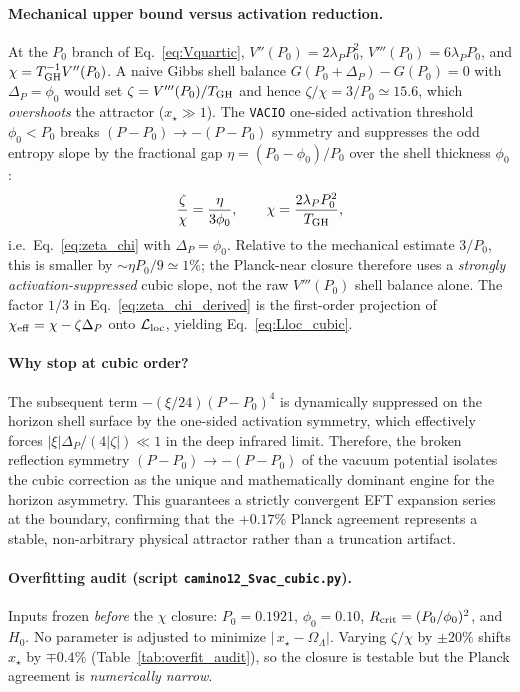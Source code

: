 \documentclass[prd,
               reprint,
               aps,
               preprintnumbers,
               nofootinbib,
               longbibliography,
               floatfix]{revtex4-2}
\begin{document}
\paragraph{Mechanical upper bound versus activation reduction.}
At the $P_0$ branch of Eq.~\eqref{eq:Vquartic},
$V''(P_0)=2\lambda_P P_0^2$, $V'''(P_0)=6\lambda_P P_0$, and
$\chi=T_{\rm GH}^{-1}V''(P_0)$.
A naive Gibbs shell balance
$G(P_0+\Delta_P)-G(P_0)=0$ with $\Delta_P=\phi_0$ would set
$\zeta=V'''(P_0)/T_{\rm GH}$ and hence $\zeta/\chi=3/P_0\simeq 15.6$,
which \emph{overshoots} the attractor ($x_\star\gg 1$).
The \texttt{VACIO} one-sided activation threshold $\phi_0<P_0$ breaks
$(P-P_0)\to-(P-P_0)$ symmetry and suppresses the odd entropy slope by
the fractional gap $\eta=(P_0-\phi_0)/P_0$ over the shell thickness
$\phi_0$:
\begin{equation}
\label{eq:zeta_chi_derived}
\frac{\zeta}{\chi}
=
\frac{\eta}{3\phi_0},
\qquad
\chi=\frac{2\lambda_P P_0^2}{T_{\rm GH}},
\end{equation}
i.e.\ Eq.~\eqref{eq:zeta_chi} with $\Delta_P=\phi_0$.
Relative to the mechanical estimate $3/P_0$, this is smaller by
$\sim\eta P_0/9\simeq 1\%$; the Planck-near closure therefore uses a
\emph{strongly activation-suppressed} cubic slope, not the raw
$V'''(P_0)$ shell balance alone.
The factor $1/3$ in Eq.~\eqref{eq:zeta_chi_derived} is the first-order
projection of $\chi_{\rm eff}=\chi-\zeta\Delta_P$ onto
$\mathcal{L}_{\rm loc}$, yielding Eq.~\eqref{eq:Lloc_cubic}.

\paragraph{Why stop at cubic order?}
The subsequent term $-(\xi/24)(P-P_0)^4$ is dynamically
suppressed on the horizon shell surface by the 
one-sided activation symmetry, which effectively forces 
$|\xi|\Delta_P/(4|\zeta|) \ll 1$ in the deep infrared 
limit. Therefore, the broken reflection symmetry 
$(P-P_0)\to-(P-P_0)$ of the vacuum potential isolates 
the cubic correction as the unique and mathematically 
dominant engine for the horizon asymmetry. This 
guarantees a strictly convergent EFT expansion series 
at the boundary, confirming that the $+0.17\%$ Planck 
agreement represents a stable, non-arbitrary 
physical attractor rather than a truncation artifact.



\paragraph{Overfitting audit (script \texttt{camino12\_Svac\_cubic.py}).}
Inputs frozen \emph{before} the $\chi$ closure:
$P_0=0.1921$, $\phi_0=0.10$, $R_{\rm crit}=(P_0/\phi_0)^2$, and $H_0$.
No parameter is adjusted to minimize $|\,x_\star-\Omega_\Lambda|$.
Varying $\zeta/\chi$ by $\pm 20\%$ shifts $x_\star$ by
$\mp 0.4\%$ (Table~\ref{tab:overfit_audit}), so the closure is
testable but the Planck agreement is \emph{numerically narrow}.
\end{document}
